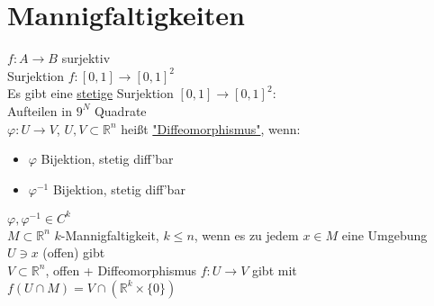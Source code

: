 \documentclass[a4paper]{article}
\newcommand{\ul}{\underline}
\let\phi\varphi
\begin{document}
\section{Mannigfaltigkeiten}
$f:A\rightarrow B$ surjektiv\\
Surjektion $f:\left[0,1\right]\rightarrow\left[0,1\right]^2$\\
Es gibt eine \ul{stetige} Surjektion $\left[0,1\right]\rightarrow\left[0,1\right]^2$:\\
Aufteilen in $9^N$ Quadrate\\
$\phi:U\rightarrow V$, $U,V\subset\mathbb{R}^n$ heißt \ul{"Diffeomorphismus"}, wenn:
\begin{itemize}
	\item $\phi$ Bijektion, stetig diff'bar
	\item $\phi^{-1}$ Bijektion, stetig diff'bar
\end{itemize}
$\phi,\phi^{-1}\in C^k$\\
$M\subset\mathbb{R}^n$ $k$-Mannigfaltigkeit, $k\leq n$, wenn es zu jedem $x\in M$ eine Umgebung $U\ni x$ (offen) gibt\\
$V\subset\mathbb{R}^n$, offen + Diffeomorphismus $f:U\rightarrow V$ gibt mit $f(U\cap M)=V\cap(\mathbb{R}^k\times\{0\})$
\end{document}
